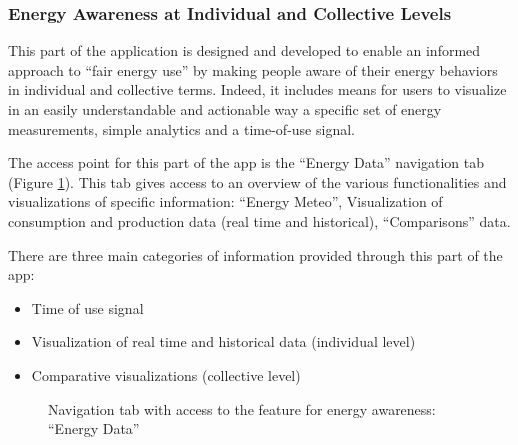 \subsubsection{Energy Awareness at Individual and Collective Levels}\label{sec:energydata}

This part of the application is designed and developed to enable an informed approach to ``fair energy use'' by making people aware of their
energy behaviors in individual and collective terms. Indeed, it includes means for users to visualize in an easily
understandable and actionable way a specific set of energy measurements, simple analytics and a time-of-use signal.

The access point for this part of the app is the ``Energy Data'' navigation tab (Figure \ref{fig:tab}). This tab gives access to an
overview of the various functionalities and visualizations of specific information: ``Energy Meteo'', Visualization of consumption and production data (real time and historical),
``Comparisons'' data.

There are three main categories of information provided through this part of the app:
\begin{itemize}
 \item Time of use signal
 \item Visualization of real time and historical data (individual level)
 \item Comparative visualizations (collective level)
\end{itemize}

\begin{figure}[htb]
\centering
{}
\caption{Navigation tab with access to the feature for energy awareness: ``Energy Data''}\label{fig:tab}
\end{figure}

